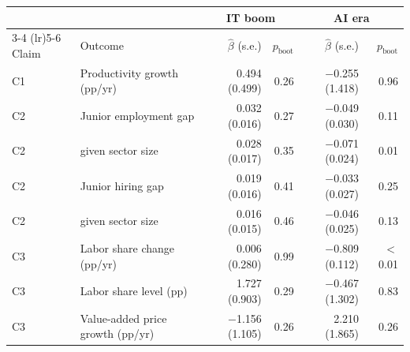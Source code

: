\begin{tabular}{llrrrr}
\toprule
 & & \multicolumn{2}{c}{IT boom} & \multicolumn{2}{c}{AI era} \\
\cmidrule(lr){3-4} \cmidrule(lr){5-6}
Claim & Outcome & $\hat\beta$ (s.e.) & $p_{\text{boot}}$ & $\hat\beta$ (s.e.) & $p_{\text{boot}}$ \\
\midrule
C1 & Productivity growth (pp/yr) & 0.494 (0.499) & 0.26 & $-$0.255 (1.418) & 0.96 \\
C2 & Junior employment gap & 0.032 (0.016) & 0.27 & $-$0.049 (0.030) & 0.11 \\
C2 & \quad given sector size & 0.028 (0.017) & 0.35 & $-$0.071 (0.024) & 0.01 \\
C2 & Junior hiring gap & 0.019 (0.016) & 0.41 & $-$0.033 (0.027) & 0.25 \\
C2 & \quad given sector size & 0.016 (0.015) & 0.46 & $-$0.046 (0.025) & 0.13 \\
C3 & Labor share change (pp/yr) & 0.006 (0.280) & 0.99 & $-$0.809 (0.112) & $<$0.01 \\
C3 & Labor share level (pp) & 1.727 (0.903) & 0.29 & $-$0.467 (1.302) & 0.83 \\
C3 & Value-added price growth (pp/yr) & $-$1.156 (1.105) & 0.26 & 2.210 (1.865) & 0.26 \\
\bottomrule
\end{tabular}
